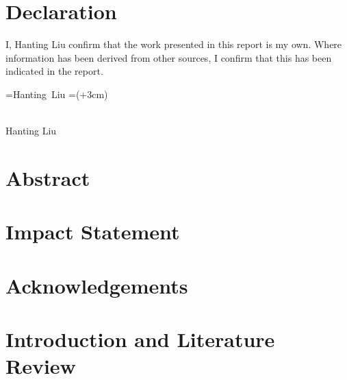 \documentclass[12pt]{report}
\def\signature#1{%
    \setbox\namebox=\hbox{#1}
    \signboxdim=\dimexpr(\wd\namebox+3cm)
    \parbox[t]{\signboxdim}{%
        \centering
            \hrulefill\\    %
            #1
        \par}%
    }
\numberwithin{figure}{chapter}
\begin{document}
\newpage
\chapter*{Declaration} %
I, Hanting Liu confirm that the work presented in this report is my own. Where information has been derived from other sources, I confirm that this has been indicated in the report.
\vspace*{3cm}

\noindent\signature{Hanting Liu}
\newpage
\newpage
\chapter*{Abstract} 


\newpage
\chapter*{Impact Statement}



\newpage
\chapter*{Acknowledgements}



\newpage
\tableofcontents 


\newpage  
\listoffigures%


\newpage
\listoftables%


\chapter{Introduction and Literature Review}


\end{document}
